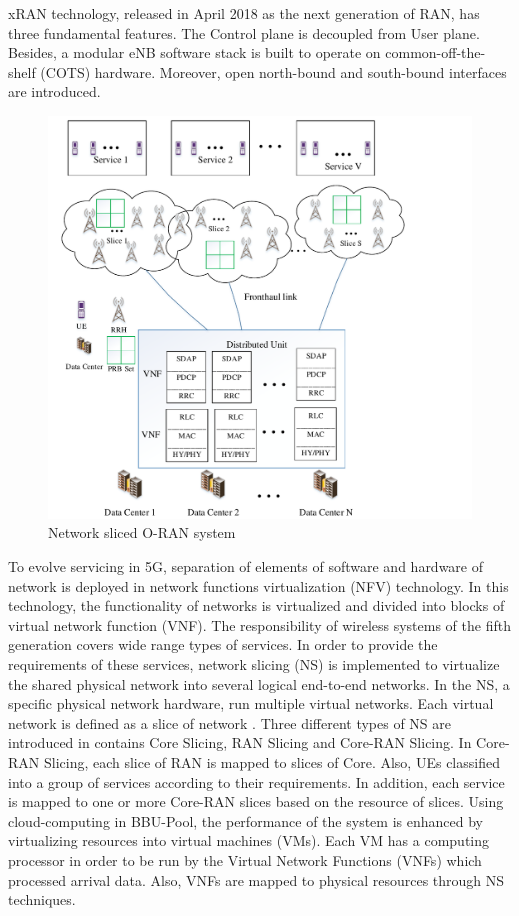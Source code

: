 \documentclass[conference]{IEEEtran}
\begin{document}
xRAN technology, released in April 2018 as the next generation of RAN, has three fundamental features. The Control plane is decoupled from User plane. Besides, a modular eNB software stack is built to operate on common-off-the-shelf (COTS) hardware. Moreover, open north-bound and south-bound interfaces are introduced\cite{xran}.


\begin{figure}
  \centering
    \includegraphics[scale=0.55]{c6}
  \caption{Network sliced O-RAN system}
  \label{fig:c11}
\end{figure} 
To evolve servicing in 5G, separation of elements of software and hardware of network is deployed in network functions virtualization (NFV) technology. In this technology, the functionality of networks is virtualized and divided into blocks of virtual network function (VNF).
The responsibility of wireless systems of the fifth generation covers wide range types of services. In order to provide the requirements of these services, network slicing (NS) is implemented to virtualize the shared physical network into several logical end-to-end networks. 
In the NS, a specific physical network hardware, run multiple virtual networks. Each virtual network is 
defined as a slice of network \cite{lee2018dynamic}.
Three different types of NS are introduced in \cite{ns1} contains Core Slicing, RAN Slicing and Core-RAN Slicing. In Core-RAN Slicing, each slice of RAN is mapped to slices of Core. Also, UEs classified into a group of services according to their requirements. In addition, each service is mapped to one or more Core-RAN slices based on the resource of slices.
Using cloud-computing in BBU-Pool, the performance of the system is enhanced by virtualizing resources
into virtual machines (VMs).
Each VM has a computing processor in order to be run by the Virtual Network Functions (VNFs) which processed arrival data. Also, VNFs are mapped to physical resources through NS techniques\cite{frdl,luong2018novel,luong2018novel1}. 
\end{document}
